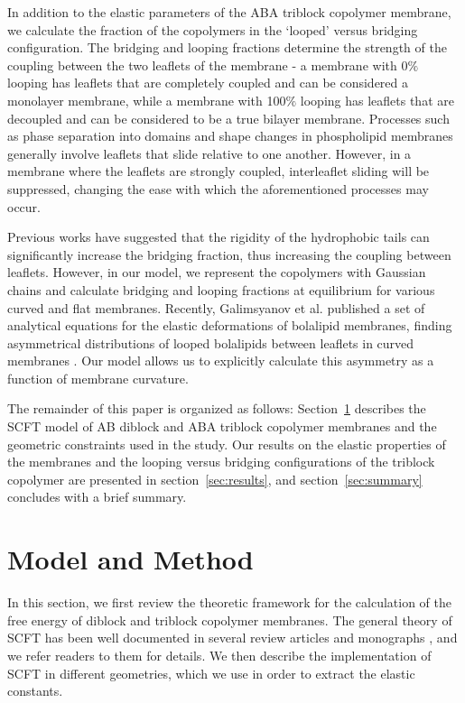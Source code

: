 \documentclass[twocolumn,aps,floatfix,nobibnotes]{revtex4-1}
\begin{document}
In addition to the elastic parameters of the ABA triblock copolymer membrane, we calculate the fraction of the copolymers in the `looped' versus bridging configuration. The bridging and looping fractions determine the strength of the coupling between the two leaflets of the membrane - a membrane with 0$\%$ looping has leaflets that are completely coupled and can be considered a monolayer membrane, while a membrane with 100$\%$ looping has leaflets that are decoupled and can be considered to be a true bilayer membrane. Processes such as phase separation into domains and shape changes in phospholipid membranes generally involve leaflets that slide relative to one another. However, in a membrane where the leaflets are strongly coupled, interleaflet sliding will be suppressed, changing the ease with which the aforementioned processes may occur. 

Previous works have suggested that the rigidity of the hydrophobic tails can significantly increase the bridging fraction, thus increasing the coupling between leaflets. However, in our model, we represent the copolymers with Gaussian chains and calculate bridging and looping fractions at equilibrium for various curved and flat membranes. Recently, Galimsyanov et al. published a set of analytical equations for the elastic deformations of bolalipid membranes, finding asymmetrical distributions of looped bolalipids between leaflets in curved membranes \cite{galimzyanov2016elastic}. Our model allows us to explicitly calculate this asymmetry as a function of membrane curvature. 

The remainder of this paper is organized as follows: Section~\ref{sec:model} describes the SCFT model of AB diblock and ABA triblock copolymer membranes and the geometric constraints used in the study. Our results on the elastic properties of the membranes and the looping versus bridging configurations of the triblock copolymer are presented in section~\ref{sec:results}, and section~\ref{sec:summary} concludes with a brief summary.



\section{Model and Method}
\label{sec:model}

In this section, we first review the theoretic framework for the calculation of the free energy of diblock and triblock copolymer membranes.
The general theory of SCFT has been well documented in several review articles
and monographs \cite{schmid1998self,fredrickson2002field,matsen2001standard,shi2004self,gompper2006soft,fredrickson2006equilibrium}, and we refer readers to them for details.
We then describe the implementation of SCFT in different geometries, which we use in order to extract the elastic constants.
\end{document}
